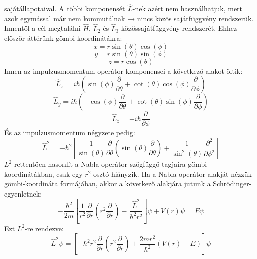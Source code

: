 \documentclass[a4paper,12pt]{article}
\begin{document}
sajátállapotaival. A többi komponensét $\hat{L}$-nek azért nem használhatjuk, mert azok egymással már nem kommutálnak → nincs közös sajátfüggvény rendszerük.
Innentől a cél megtalálni $\hat{H}$, $\hat{L}_2$ és $\hat{L}_3$ közössajátfüggvény rendszerét. Ehhez először áttérünk gömbi-koordinátákra:
\begin{equation}
    x = r \sin(\theta) \cos(\phi)
\end{equation}
\begin{equation}
    y = r \sin(\theta) \sin(\phi)
\end{equation}
\begin{equation}
    z = r \cos(\theta)
\end{equation}
Innen az impulzusmomentum operátor komponensei a következő alakot öltik:
\begin{equation}
    \hat{L}_x = i \hbar \left( \sin(\phi) \frac{\partial}{\partial \theta} + \cot(\theta) \cos(\phi) \frac{\partial}{\partial \phi} \right)
\end{equation}
\begin{equation}
    \hat{L}_y = i \hbar \left( - \cos(\phi) \frac{\partial}{\partial \theta} + \cot(\theta) \sin(\phi) \frac{\partial}{\partial \phi} \right)
\end{equation}
\begin{equation}
    \hat{L}_z = - i \hbar \frac{\partial}{\partial \phi}
\end{equation}
És az impulzusmomentum négyzete pedig:
\begin{equation}
    \hat{L}^2 = - \hbar^2 \left[ \frac{1}{\sin(\theta)} \frac{\partial}{\partial \theta} \left( \sin(\theta) \frac{\partial}{\partial \theta} \right) + \frac{1}{\sin^2(\theta)} \frac{\partial^2}{\partial \phi^2} \right]
\end{equation}
$L^2$ rettentően hasonlít a Nabla operátor szögfüggő tagjaira gömbi-koordinátákban, csak egy $r^2$ osztó hiányzik.
Ha a Nabla operátor alakját nézzük gömbi-koordináta formájában, akkor a következő alakjára jutunk a Schrödinger-egyenletnek:
\begin{equation}
    - \frac{\hbar^2}{2m} \left[ \frac{1}{r^2} \frac{\partial}{\partial r} \left( r^2 \frac{\partial}{\partial r} \right) - \frac{\hat{L}^2}{\hbar^2 r^2} \right] \psi + V(r) \psi = E \psi
\end{equation}
Ezt $L^2$-re rendezve:
\begin{equation}
    \hat{L}^2 \psi = \left[ - \hbar^2 r^2 \frac{\partial}{\partial r} \left( r^2 \frac{\partial}{\partial r} \right) + \frac{2m r^2}{\hbar^2} (V(r) - E) \right] \psi
\end{equation}
\end{document}
